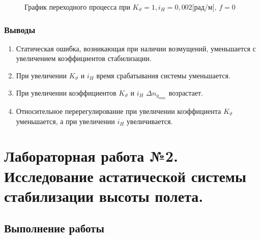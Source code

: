 \documentclass[a4paper,12pt]{article}
\begin{document}
    \begin{figure}[H]
        \caption{График переходного процесса при $K_{\vartheta}=1, i_H=0,002$[рад/м], $f=0$}
        \label{fig:Переходный процесс 2}
    \end{figure}

    \subsubsection{Выводы}
    \begin{enumerate}
        \item Статическая ошибка, возникающая при наличии возмущений, уменьшается с увеличением коэффициентов стабилизации.
        \item При увеличении $K_{\vartheta}$  и $i_H$ время срабатывания системы уменьшается.
        \item При увеличении коэффициентов $K_{\vartheta}$  и $i_H$ $\Delta n_{y_{max}}$ возрастает. 
        \item Относительное перерегулирование при увеличении коэффициента $K_{\vartheta}$ уменьшается, а при увеличении $i_H$ увеличивается.
    \end{enumerate}

\section{Лабораторная работа №2. Исследование астатической системы стабилизации высоты полета.}
    \subsection{Выполнение работы}
\end{document}
